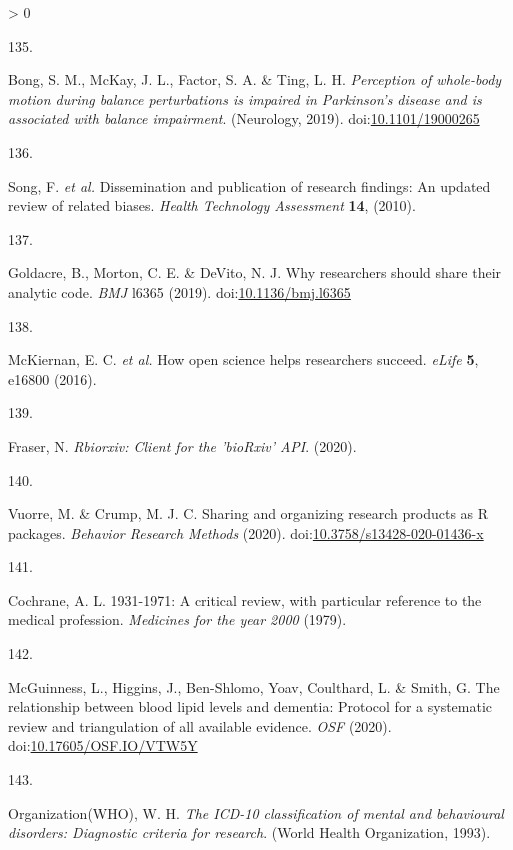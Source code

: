\documentclass[a4paper, twoside]{templates/ociamthesis}
\newlength{\cslhangindent}
\newlength{\csllabelwidth}
\newenvironment{CSLReferences}[3] %
 {%
  \setlength{\parindent}{0pt}
  \ifodd #1 \everypar{\setlength{\hangindent}{\cslhangindent}}\ignorespaces\fi
  \ifnum #2 > 0
  \setlength{\parskip}{#2\baselineskip}
  \fi
 }%
 {}
\newcommand{\CSLLeftMargin}[1]{\parbox[t]{\maxof{\widthof{#1}}{\csllabelwidth}}{#1}}
\newcommand{\CSLRightInline}[1]{\parbox[t]{\linewidth - \csllabelwidth}{#1}}
\begin{document}
\begin{CSLReferences}{0}{0}
\leavevmode\hypertarget{ref-bong2019}{}%
\CSLLeftMargin{135. }
\CSLRightInline{Bong, S. M., McKay, J. L., Factor, S. A. \& Ting, L. H. \emph{Perception of whole-body motion during balance perturbations is impaired in {Parkinson}'s disease and is associated with balance impairment}. ({Neurology}, 2019). doi:\href{https://doi.org/10.1101/19000265}{10.1101/19000265}}

\leavevmode\hypertarget{ref-song2010}{}%
\CSLLeftMargin{136. }
\CSLRightInline{Song, F. \emph{et al.} Dissemination and publication of research findings: An updated review of related biases. \emph{Health Technology Assessment} \textbf{14}, (2010).}

\leavevmode\hypertarget{ref-goldacre2019}{}%
\CSLLeftMargin{137. }
\CSLRightInline{Goldacre, B., Morton, C. E. \& DeVito, N. J. Why researchers should share their analytic code. \emph{BMJ} l6365 (2019). doi:\href{https://doi.org/10.1136/bmj.l6365}{10.1136/bmj.l6365}}

\leavevmode\hypertarget{ref-mckiernan2016}{}%
\CSLLeftMargin{138. }
\CSLRightInline{McKiernan, E. C. \emph{et al.} How open science helps researchers succeed. \emph{eLife} \textbf{5}, e16800 (2016).}

\leavevmode\hypertarget{ref-fraser2020rbiorixv}{}%
\CSLLeftMargin{139. }
\CSLRightInline{Fraser, N. \emph{Rbiorxiv: Client for the '{bioRxiv}' {API}}. (2020).}

\leavevmode\hypertarget{ref-vuorre2020}{}%
\CSLLeftMargin{140. }
\CSLRightInline{Vuorre, M. \& Crump, M. J. C. Sharing and organizing research products as {R} packages. \emph{Behavior Research Methods} (2020). doi:\href{https://doi.org/10.3758/s13428-020-01436-x}{10.3758/s13428-020-01436-x}}

\leavevmode\hypertarget{ref-cochrane1979}{}%
\CSLLeftMargin{141. }
\CSLRightInline{Cochrane, A. L. 1931-1971: A critical review, with particular reference to the medical profession. \emph{Medicines for the year 2000} (1979).}

\leavevmode\hypertarget{ref-mcguinnessluke2020}{}%
\CSLLeftMargin{142. }
\CSLRightInline{McGuinness, L., Higgins, J., Ben-Shlomo, Yoav, Coulthard, L. \& Smith, G. The relationship between blood lipid levels and dementia: Protocol for a systematic review and triangulation of all available evidence. \emph{OSF} (2020). doi:\href{https://doi.org/10.17605/OSF.IO/VTW5Y}{10.17605/OSF.IO/VTW5Y}}

\leavevmode\hypertarget{ref-organizationwho1993}{}%
\CSLLeftMargin{143. }
\CSLRightInline{Organization(WHO), W. H. \emph{The {ICD}-10 classification of mental and behavioural disorders: Diagnostic criteria for research}. ({World Health Organization}, 1993).}


\end{CSLReferences}
\end{document}
